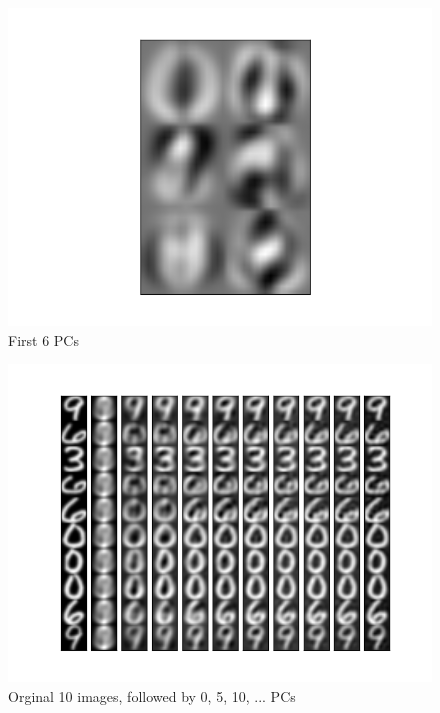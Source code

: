 \documentclass[a4paper,11pt]{article}
\begin{document}
\begin{figure}[H]
\endminipage\hfill
{}%
  \includegraphics[width=\linewidth]{5_b_c_00.png}
  \caption{First 6 PCs}\label{fig:awesome_image3}
\endminipage
\end{figure}

\begin{figure}[H]
  \includegraphics[width=\linewidth]{5_c_Xprime_00_45_allinone.png}
  \caption{Orginal 10 images, followed by 0, 5, 10, ... PCs}\label{fig:6}
\end{figure}
\end{document}
